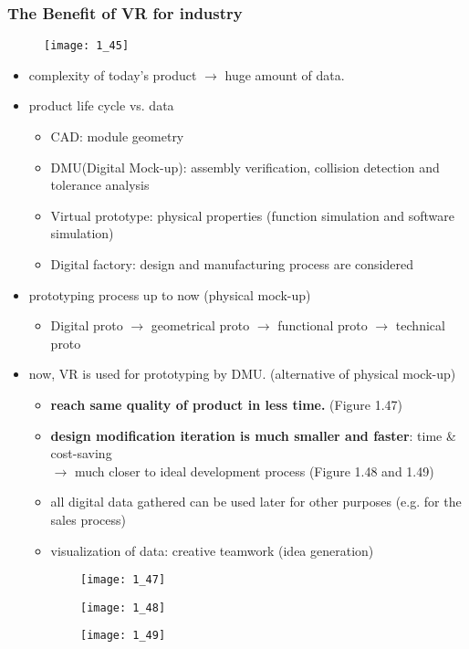 \documentclass{standalone}
\begin{document}
\subsubsection{The Benefit of VR for industry}

\begin{figure}[H]
	\texttt{[image: 1\_45]}
\end{figure}

\begin{itemize}
	\item complexity of today's product $\rightarrow$ huge amount of data.
	\item product life cycle vs. data
		\begin{itemize}
			\item CAD: module geometry
			\item DMU(Digital Mock-up): assembly verification, collision detection and tolerance analysis
			\item Virtual prototype: physical properties (function simulation and software simulation)
			\item Digital factory: design and manufacturing process are considered
		\end{itemize}
	\item prototyping process up to now (physical mock-up)
		\begin{itemize}
			\item Digital proto $\rightarrow$ geometrical proto $\rightarrow$ functional proto $\rightarrow$ technical proto
		\end{itemize}
	\item now, VR is used for prototyping by DMU. (alternative of physical mock-up)
		\begin{itemize}
			\item \textbf{reach same quality of product in less time.} (Figure 1.47)
			\item \textbf{design modification iteration is much smaller and faster}: time \& cost-saving \\
				$\rightarrow$ much closer to ideal development process (Figure 1.48 and 1.49)
			\item all digital data gathered can be used later for other purposes (e.g. for the sales process)
			\item visualization of data: creative teamwork (idea generation)
		\end{itemize}
\end{itemize}

\begin{figure}[H]
	\centering
	\begin{subfigure}[b]{0.3\textwidth}	
		\texttt{[image: 1\_47]}
	\end{subfigure}
	\begin{subfigure}[b]{0.3\textwidth}	
		\texttt{[image: 1\_48]}
	\end{subfigure}
	\begin{subfigure}[b]{0.3\textwidth}	
		\texttt{[image: 1\_49]}
	\end{subfigure}
\end{figure}
\end{document}
